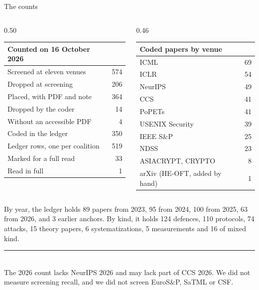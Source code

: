 \documentclass[aspectratio=169,10pt]{beamer}
\newcommand{\redline}{\textcolor{kred}{\rule{\textwidth}{1pt}}}
\begin{document}
\begin{frame}{The counts}
  \begin{columns}[T]
    \begin{column}{0.50\textwidth}
      \footnotesize
      \begin{tabular}{@{}lr@{}}
        \toprule
        Counted on 16 October 2026 & \\
        \midrule
        Screened at eleven venues & 574\\
        Dropped at screening & 206\\
        Placed, with PDF and note & 364\\
        Dropped by the coder & 14\\
        Without an accessible PDF & 4\\
        Coded in the ledger & 350\\
        Ledger rows, one per coalition & 519\\
        Marked for a full read & 33\\
        Read in full & 1\\
        \bottomrule
      \end{tabular}
    \end{column}
    \begin{column}{0.46\textwidth}
      \footnotesize
      \begin{tabular}{@{}lr@{}}
        \toprule
        Coded papers by venue & \\
        \midrule
        ICML & 69\\
        ICLR & 54\\
        NeurIPS & 49\\
        CCS & 41\\
        PoPETs & 41\\
        USENIX Security & 39\\
        IEEE S\&P & 25\\
        NDSS & 23\\
        ASIACRYPT, CRYPTO & 8\\
        arXiv (HE-OFT, added by hand) & 1\\
        \bottomrule
      \end{tabular}
    \end{column}
  \end{columns}
  \vspace{0.5em}
  \small By year, the ledger holds 89 papers from 2023, 95 from 2024, 100 from 2025, 63 from 2026, and 3 earlier anchors. By kind, it holds 124 defences, 110 protocols, 74 attacks, 15 theory papers, 6 systematizations, 5 measurements and 16 of mixed kind.\\[0.4em]
  \redline\\[0.3em]
  \small The 2026 count lacks NeurIPS 2026 and may lack part of CCS 2026. We did not measure screening recall, and we did not screen EuroS\&P, SaTML or CSF.
\end{frame}
\end{document}
